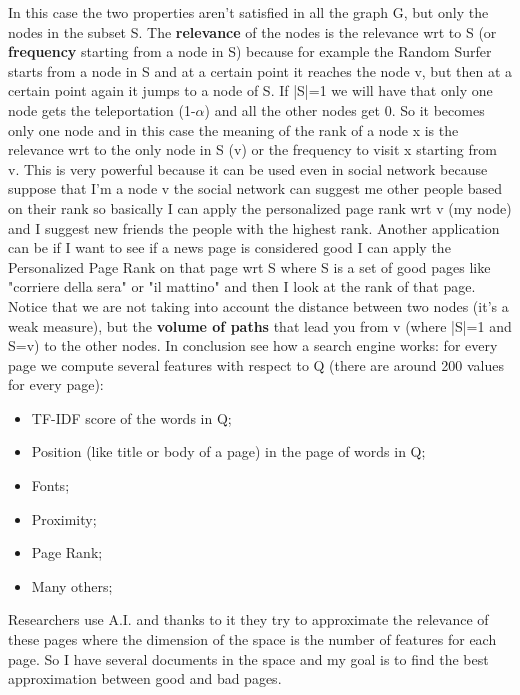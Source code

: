 In this case the two properties aren't satisfied in all the graph G, but only the nodes in the subset S.\newline
The \textbf{relevance} of the nodes is the relevance wrt to S (or \textbf{frequency} starting from a node in S) because for example the Random Surfer starts from a node in S and at a certain point it reaches the node v, but then at a certain point again it jumps to a node of S.\newline
If |S|=1 we will have that only one node gets the teleportation (1-$\alpha$) and all the other nodes get 0. So it becomes only one node and in this case the meaning of the rank of a node x is the relevance wrt to the only node in S (v) or the frequency to visit x starting from v.\newline
This is very powerful because it can be used even in social network because suppose that I'm a node v the social network can suggest me other people based on their rank so basically I can apply the personalized page rank wrt v (my node) and I suggest new friends the people with the highest rank.\newline
Another application can be if I want to see if a news page is considered good I can apply the Personalized Page Rank on that page wrt S where S is a set of good pages like "corriere della sera" or "il mattino" and then I look at the rank of that page.\newline
Notice that we are not taking into account the distance between two nodes (it's a weak measure), but the \textbf{volume of paths} that lead you from v (where |S|=1 and S=v) to the other nodes.\newline
In conclusion see how a search engine works: for every page we compute several features with respect to Q (there are around 200 values for every page):
\begin{itemize}
    \item TF-IDF score of the words in Q;
    \item Position (like title or body of a page) in the page of words in Q;
    \item Fonts;
    \item Proximity;
    \item Page Rank;
    \item Many others;
\end{itemize}
Researchers use A.I. and thanks to it they try to approximate the relevance of these pages where the dimension of the space is the number of features for each page. So I have several documents in the space and my goal is to find the best approximation between good and bad pages.\newline

